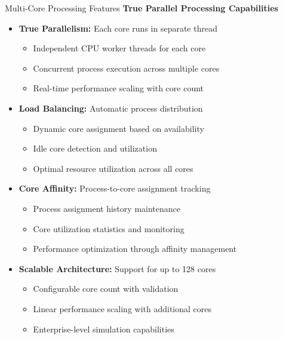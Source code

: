 \documentclass[10pt]{beamer}
\begin{document}
\begin{frame}{Multi-Core Processing Features}
    \textbf{True Parallel Processing Capabilities}
    
    \begin{itemize}
        \item \textbf{True Parallelism:} Each core runs in separate thread
        \begin{itemize}
            \item Independent CPU worker threads for each core
            \item Concurrent process execution across multiple cores
            \item Real-time performance scaling with core count
        \end{itemize}
        
        \item \textbf{Load Balancing:} Automatic process distribution
        \begin{itemize}
            \item Dynamic core assignment based on availability
            \item Idle core detection and utilization
            \item Optimal resource utilization across all cores
        \end{itemize}
        
        \item \textbf{Core Affinity:} Process-to-core assignment tracking
        \begin{itemize}
            \item Process assignment history maintenance
            \item Core utilization statistics and monitoring
            \item Performance optimization through affinity management
        \end{itemize}
        
        \item \textbf{Scalable Architecture:} Support for up to 128 cores
        \begin{itemize}
            \item Configurable core count with validation
            \item Linear performance scaling with additional cores
            \item Enterprise-level simulation capabilities
        \end{itemize}
    \end{itemize}
\end{frame}
\end{document}
